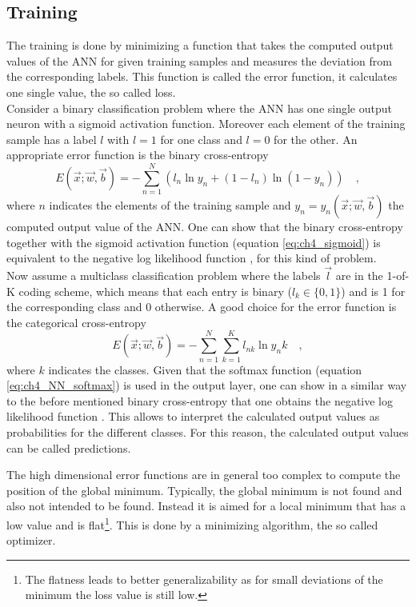 \subsection{Training}\label{sec:ch_4_training}
The training is done by minimizing a function that takes the computed output values of the ANN for given training samples and measures the deviation from the corresponding labels. This function is called the error function, it calculates one single value, the so called loss.\\

Consider a binary classification problem where the ANN has one single output neuron with a sigmoid activation function. Moreover each element of the training sample has a label $l$ with $l=1$ for one class and $l=0$ for the other. An appropriate error function is the binary cross-entropy 
\begin{equation}\label{eq:ch4_bce}
E(\vec{x};\vec{w},\vec{b}) = - \sum_{n=1}^{N}\left( l_{n} \ln y_n + (1-l_n)\ln(1-y_n) \right)\quad ,
\end{equation}
where $n$ indicates the elements of the training sample and $y_n = y_n(\vec{x};\vec{w},\vec{b})$ the computed output value of the ANN. One can show that the binary cross-entropy together with the sigmoid activation function (equation \ref{eq:ch4_sigmoid}) is equivalent to the negative log likelihood function \cite[p. 234-236]{Bishop}, for this kind of problem.\\

Now assume a multiclass classification problem where the labels $\vec{l}$ are in the 1-of-K coding scheme, which means that each entry is binary ($l_k \in \{0,1\}$) and is 1 for the corresponding class and 0 otherwise. A good choice for the error function is the categorical cross-entropy
\begin{equation}\label{eq:ch4_cce}
E(\vec{x};\vec{w},\vec{b}) = - \sum_{n=1}^{N} \sum_{k=1}^{K} l_{nk} \ln y_nk \quad ,
\end{equation}
where $k$ indicates the classes. Given that the softmax function (equation \ref{eq:ch4_NN_softmax}) is used in the output layer, one can show in a similar way to the before mentioned binary cross-entropy that one obtains the negative log likelihood function \cite[p. 234-236]{Bishop}. This allows to interpret the calculated output values as probabilities for the different classes. For this reason, the calculated output values can be called predictions. 

The high dimensional error functions are in general too complex to compute the position of the global minimum. Typically, the global minimum is not found and also not intended to be found. Instead it is aimed for a local minimum that has a low value and is flat\footnote{The flatness leads to better generalizability as for small deviations of the minimum the loss value is still low.}. This is done by a minimizing algorithm, the so called optimizer.\\

